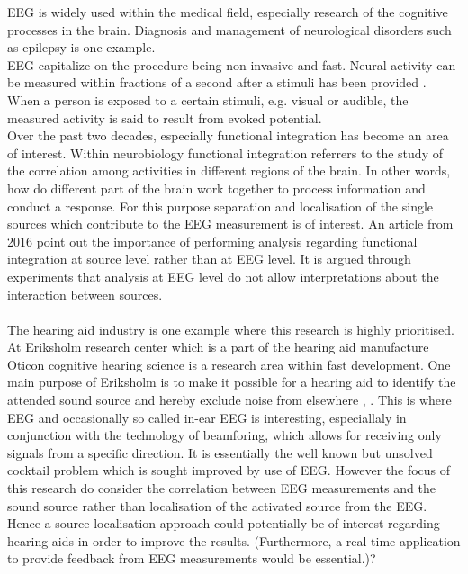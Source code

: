 \noindent
EEG is widely used within the medical field, especially research of the cognitive processes in the brain. Diagnosis and management of neurological disorders such as epilepsy is one example.\\
EEG capitalize on the procedure being non-invasive and fast.
Neural activity can be measured within fractions of a second after a stimuli has been provided \cite[p. 3]{fundamentalEEG}. When a person is exposed to a certain stimuli, e.g. visual or audible, the measured activity is said to result from evoked potential.
\\
Over the past two decades, especially functional integration has become an area of interest\cite{Friston2011}. Within neurobiology functional integration referrers to the study of the correlation among activities in different regions of the brain. In other words, how do different part of the brain work together to process information and conduct a response\cite{Friston2002}.     
For this purpose separation and localisation of the single sources which contribute to the EEG measurement is of interest. An article from 2016 point out the importance of performing analysis regarding functional integration at source level rather than at EEG level. It is argued through experiments that analysis at EEG level do not allow interpretations about the interaction between sources\cite{Van2019}.  
\\ 
\\
The hearing aid industry is one example where this research is highly prioritised. At Eriksholm research center which is a part of the hearing aid manufacture Oticon cognitive hearing science is a research area within fast development\cite{Weberik}. One main purpose of Eriksholm is to make it possible for a hearing aid to identify the attended sound source and hereby exclude noise from elsewhere \cite{Emina2019}, \cite{Bech2018}. This is where EEG and occasionally so called in-ear EEG is interesting, especiallaly in conjunction with the technology of beamforing, which allows for receiving only signals from a specific direction. It is essentially the well known but unsolved cocktail problem which is sought improved by use of EEG. However the focus of this research do consider the correlation between EEG measurements and the sound source rather than localisation of the activated source from the EEG\cite{Emina2019}. Hence a source localisation approach could potentially be of interest regarding hearing aids in order to improve the results.
(Furthermore, a real-time application to provide feedback from EEG measurements would be essential.)? 


